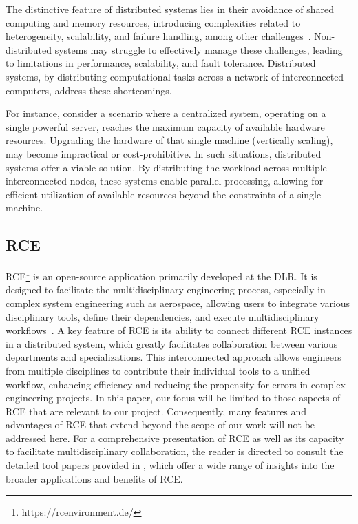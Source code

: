 The distinctive feature of distributed systems lies in their avoidance of shared computing and memory resources, introducing complexities related to heterogeneity, scalability, and failure handling, among other challenges~\cite{coulouris2005distributed}. Non-distributed systems may struggle to effectively manage these challenges, leading to limitations in performance, scalability, and fault tolerance. Distributed systems, by distributing computational tasks across a network of interconnected computers, address these shortcomings.

For instance, consider a scenario where a centralized system, operating on a single powerful server, reaches the maximum capacity of available hardware resources. Upgrading the hardware of that single machine (vertically scaling), may become impractical or cost-prohibitive. In such situations, distributed systems offer a viable solution. By distributing the workload across multiple interconnected nodes, these systems enable parallel processing, allowing for efficient utilization of available resources beyond the constraints of a single machine. 

\subsection{\acl{RCE}}
\label{subsec:rce}
\ac{RCE}\footnote{https://rcenvironment.de/} is an open-source application primarily developed at the \ac{DLR}. It is designed to facilitate the multidisciplinary engineering process, especially in complex system engineering such as aerospace, allowing users to integrate various disciplinary tools, define their dependencies, and execute multidisciplinary workflows~\cite{BODEN2021100759}. A key feature of \ac{RCE} is its ability to connect different \ac{RCE} instances in a distributed system, which greatly facilitates collaboration between various departments and specializations. This interconnected approach allows engineers from multiple disciplines to contribute their individual tools to a unified workflow, enhancing efficiency and reducing the propensity for errors in complex engineering projects. In this paper, our focus will be limited to those aspects of \ac{RCE} that are relevant to our project. Consequently, many features and advantages of \ac{RCE} that extend beyond the scope of our work will not be addressed here. For a comprehensive presentation of \ac{RCE} as well as its capacity to facilitate multidisciplinary collaboration, the reader is directed to consult the detailed tool papers provided in \cite{BODEN2021100759,boden2019distributed}, which offer a wide range of insights into the broader applications and benefits of \ac{RCE}.~\cite{BODEN2021100759}

